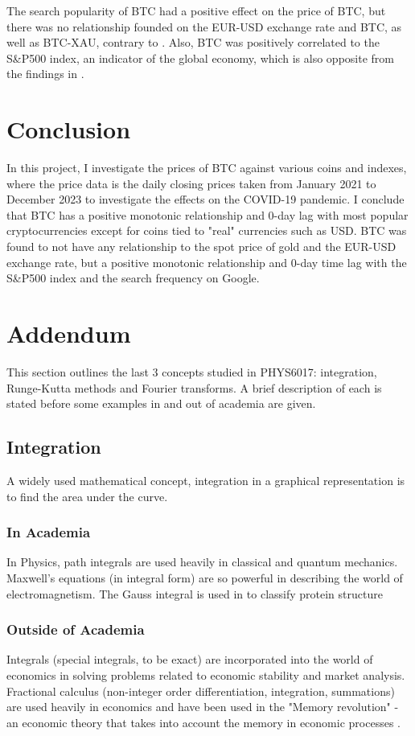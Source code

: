 \documentclass[a4paper, 10pt, conference]{ieeeconf}      %
\begin{document}
The search popularity of BTC had a positive effect on the price of BTC, but there was no relationship founded on the EUR-USD exchange rate and BTC, as well as BTC-XAU, contrary to \cite{Georgoula2015}. Also, BTC was positively correlated to the S\&P500 index, an indicator of the global economy, which is also opposite from the findings in \cite{Georgoula2015}.

\section{Conclusion}
In this project, I investigate the prices of BTC against various coins and indexes, where the price data is the daily closing prices taken from January 2021 to December 2023 to investigate the effects on the COVID-19 pandemic. I conclude that BTC has a positive monotonic relationship and 0-day lag with most popular cryptocurrencies except for coins tied to "real" currencies such as USD. BTC was found to not have any relationship to the spot price of gold and the EUR-USD exchange rate, but a positive monotonic relationship and 0-day time lag with the S\&P500 index and the search frequency on Google. 

\section{Addendum}{\label{addendum}}
This section outlines the last 3 concepts studied in PHYS6017: integration, Runge-Kutta methods and Fourier transforms. A brief description of each is stated before some examples in and out of academia are given.
\\
\subsection{Integration}
A widely used mathematical concept, integration in a graphical representation is to find the area under the curve.
\\
\subsubsection{In Academia}
In Physics, path integrals are used heavily in classical and quantum mechanics. Maxwell's equations (in integral form) are so powerful in describing the world of electromagnetism. The Gauss integral is used in \cite{Rogen2003} to classify protein structure 
\\
\subsubsection{Outside of Academia}
Integrals (special integrals, to be exact) are incorporated into the world of economics \cite{Sherdor2023} in solving problems related to economic stability and market analysis. Fractional calculus (non-integer order differentiation, integration, summations) \cite{Ross1977} are used heavily in economics and have been used in the "Memory revolution" - an economic theory that takes into account the memory in economic processes \cite{Tarasov2019}. 
\\
\end{document}

